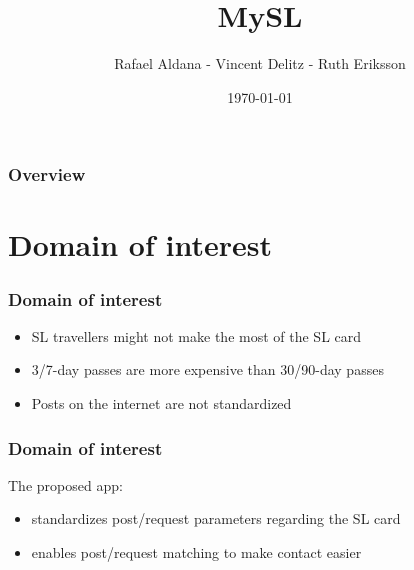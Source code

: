 \documentclass{beamer}
\title[Group 5 - MySL]{MySL} %
\author{Rafael Aldana - Vincent Delitz - Ruth Eriksson} %
\institute[] %
{
ID2216 Developing Mobile Applications\\ %
\medskip
\textit{Group 5 - Project presentation} %
}
\date{\today} %
\begin{document}
\begin{frame}
\titlepage %
\end{frame}

\begin{frame}
\frametitle{Overview} %
\tableofcontents %
\end{frame}



\section{Domain of interest} %

\begin{frame}
\frametitle{Domain of interest} %
\begin{itemize}
\item SL travellers might not make the most of the SL card
\item 3/7-day passes are more expensive than 30/90-day passes
\item Posts on the internet are not standardized
\end{itemize}
\end{frame}


\begin{frame}
\frametitle{Domain of interest} %
The proposed app:
\begin{itemize}
\item standardizes post/request parameters regarding the SL card
\item enables post/request matching to make contact easier
\end{itemize}
\end{frame}
\end{document}

